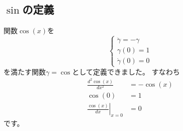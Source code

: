 \subsection{$\sin$の定義}

関数$\cos(x)$を
\[
  \begin{cases}
    \ddot{\gamma}=-\gamma\\
    \gamma(0)=1\\
    \dot\gamma(0)=0
  \end{cases}
\]
を満たす関数$\gamma=\cos$として定義できました。
すなわち
\begin{align*}
  \frac{d^2\cos(x)}{dx^2}&=-\cos(x)\\
  \cos(0)&=1\\
  \left.\frac{\cos(x)}{dx}\right|_{x=0}&=0
\end{align*}
です。

